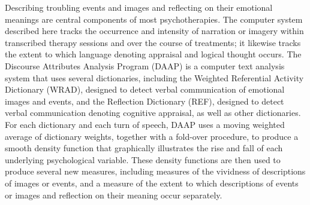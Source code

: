 Describing troubling events and images and reflecting on their emotional meanings are central components of most psychotherapies. The computer system described here tracks the occurrence and intensity of narration or imagery within transcribed therapy sessions and over the course of treatments; it likewise tracks the extent to which language denoting appraisal and logical thought occurs. The Discourse Attributes Analysis Program (DAAP) is a computer text analysis system that uses several dictionaries, including the Weighted Referential Activity Dictionary (WRAD), designed to detect verbal communication of emotional images and events, and the Reflection Dictionary (REF), designed to detect verbal communication denoting cognitive appraisal, as well as other dictionaries. For each dictionary and each turn of speech, DAAP uses a moving weighted average of dictionary weights, together with a fold-over procedure, to produce a smooth density function that graphically illustrates the rise and fall of each underlying psychological variable. These density functions are then used to produce several new measures, including measures of the vividness of descriptions of images or events, and a measure of the extent to which descriptions of events or images and reflection on their meaning occur separately.
